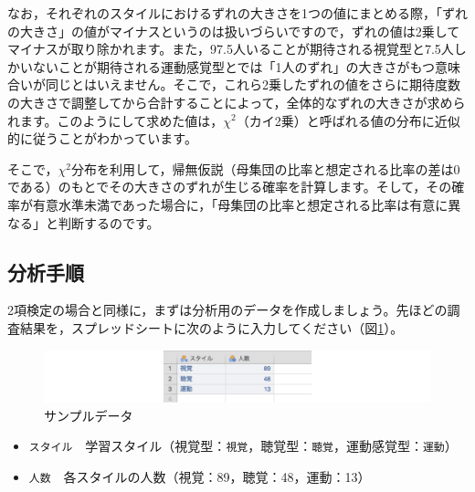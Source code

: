 \documentclass[
  12pt,
  a5jpaper,
  lualatex, ja=standard]{bxjsbook}
\providecommand{\tightlist}{%
  \setlength{\itemsep}{0pt}\setlength{\parskip}{0pt}}
\newenvironment{jmvvar}{%
	\begin{center}%
	\begin{tcolorbox}[%
		title=変数一覧,
		colframe=daidai,
		colbacktitle=daidai!30!white,
		coltitle=daidai!10!black,
		colback=daidai!2!white,
		breakable,
		width=.9\textwidth
		]\small\addtolength{\leftmargini}{-3\labelsep}%
	}%
	{\end{tcolorbox}\end{center}}
\begin{document}
なお，それぞれのスタイルにおけるずれの大きさを1つの値にまとめる際，「ずれの大きさ」の値がマイナスというのは扱いづらいですので，ずれの値は2乗してマイナスが取り除かれます。また，97.5人いることが期待される視覚型と7.5人しかいないことが期待される運動感覚型とでは「1人のずれ」の大きさがもつ意味合いが同じとはいえません。そこで，これら2乗したずれの値をさらに期待度数の大きさで調整してから合計することによって，全体的なずれの大きさが求められます。このようにして求めた値は，\(\chi^2\)（カイ2乗）と呼ばれる値の分布に近似的に従うことがわかっています。

そこで，\(\chi^2\)分布を利用して，帰無仮説（母集団の比率と想定される比率の差は0である）のもとでその大きさのずれが生じる確率を計算します。そして，その確率が有意水準未満であった場合に，「母集団の比率と想定される比率は有意に異なる」と判断するのです。

\hypertarget{sub:frequencies-n-outcomes-procedure}{%
\subsection{分析手順}\label{sub:frequencies-n-outcomes-procedure}}

2項検定の場合と同様に，まずは分析用のデータを作成しましょう。先ほどの調査結果を，スプレッドシートに次のように入力してください（図\ref{fig:frequencies-data02}）。

\begin{figure}[!ht]

{\centering \includegraphics[width=1\linewidth]{images/frequencies/data02} 

}

\caption{サンプルデータ}\label{fig:frequencies-data02}
\end{figure}

\begin{jmvvar}

\begin{itemize}
\tightlist
\item
  \texttt{スタイル}　学習スタイル（視覚型：\texttt{視覚}，聴覚型：\texttt{聴覚}，運動感覚型：\texttt{運動}）
\item
  \texttt{人数}　各スタイルの人数（視覚：89，聴覚：48，運動：13）
\end{itemize}

\end{jmvvar}
\end{document}
